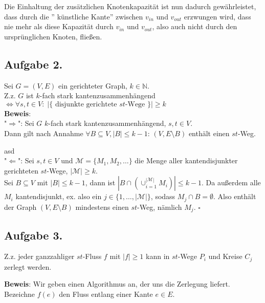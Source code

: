 \documentclass[11pt,a4paper,ngerman]{article}
\begin{document}
\begin{enumerate}[a)]
Die Einhaltung der zusätzlichen Knotenkapazität ist nun dadurch gewährleistet,
dass durch die '' künstliche Kante'' zwischen $v_{in}$ und $v_{out}$ erzwungen wird,
dass nie mehr als diese Kapazität durch $v_{in}$ und $v_{out}$, also auch nicht 
durch den ursprünglichen Knoten, fließen.
\end{enumerate}

\subsection*{Aufgabe 2.}
Sei $G = (V,E)$ ein gerichteter Graph, $k \in \mathbb{N}$. \\
Z.z. $G$ ist $k$-fach stark kantenzusammenhängend \\
  $\Leftrightarrow \forall s,t \in V: \; \left|\{ \text{ disjunkte gerichtete $st$-Wege } \}\right| \geq k$ \\

\textbf{Beweis}: \\
"$\Rightarrow$": Sei $G$ $k$-fach stark kantenzusammenhängend, $s,t \in V$. \\
Dann gilt nach Annahme $\forall B \subseteq V, |B| \leq k-1: \, (V,E \setminus B)$ enthält einen $st$-Weg.


asd \\

"$\Leftarrow$": Sei $s,t \in V$ und $\mathcal{M} = \{M_1, M_2, \ldots \}$ die Menge aller kantendisjunkter gerichteten $st$-Wege, $|\mathcal{M}| \geq k$.\\
Sei $B \subseteq V$ mit $|B| \leq k-1$, dann ist $|B \cap \left(\cup_{i=1}^{|\mathcal{M}|} M_i\right)| \leq k-1$.
Da außerdem alle $M_i$ kantendisjunkt, ex. also ein $j \in \{1,\ldots,|\mathcal{M}| \}$, sodass $M_j \cap B = \emptyset$.
Also enthält der Graph $(V, E \setminus B)$ mindestens einen $st$-Weg, nämlich $M_j$.
\mbox{} \hfill $\square$
\subsection*{Aufgabe 3.}
Z.z. jeder ganzzahliger $st$-Fluss $f$ mit $|f| \geq 1$ kann in $st$-Wege $P_i$ und Kreise $C_j$ zerlegt werden.

\textbf{Beweis}: Wir geben einen Algorithmus an, der uns die Zerlegung liefert. Bezeichne $f(e)$ den Fluss entlang einer Kante $e \in E$.
\end{document}
